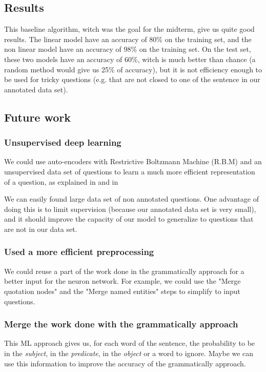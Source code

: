 \subsection{Results}

This baseline algorithm, witch was the goal for the midterm, give us quite good results.
The linear model have an accuracy of 80\% on the training set, and the non linear model have an accuracy of 98\% on the training set.
On the test set, these two models have an accuracy of 60\%, witch is much better than chance (a random method would give us 25\% of accuracy), but it is not efficiency enough to be used for tricky questions (e.g. that are not closed to one of the sentence in our annotated data set).

\subsection{Future work}

\subsubsection{Unsupervised deep learning}

We could use auto-encoders  with Restrictive Boltzmann Machine (R.B.M) and an unsupervised data set of questions to learn a much more efficient representation of a question, as explained in \cite{fischer2012introduction} and in \cite{hinton2006reducing}

We can easily found large data set of non annotated questions.
One advantage of doing this is to limit supervision (because our annotated data set is very small), and it should improve the capacity of our model to generalize to questions that are not in our data set.

\subsubsection{Used a more efficient preprocessing}

We could reuse a part of the work done in the grammatically approach for a better input for the neuron network. For example, we could use the "Merge quotation nodes" and the "Merge named entities" steps to simplify to input questions.

\subsubsection{Merge the work done with the grammatically approach}

This ML approach gives us, for each word of the sentence, the probability to be in the \textit{subject}, in the \textit{predicate}, in the \textit{object} or a word to ignore.
Maybe we can use this information to improve the accuracy of the grammatically approach.


